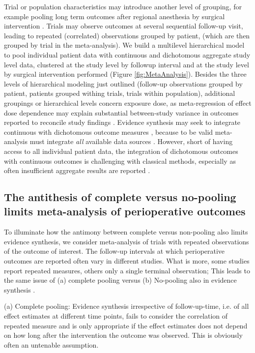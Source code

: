 \documentclass[11pt,notitlepage]{article}
\begin{document}
Trial or population characteristics may introduce another level of grouping, for example pooling long term outcomes after regional anesthesia by surgical intervention \cite{Andreae2013,Abroug2011}. Trials may observe outcomes at several sequential follow-up visit, leading to repeated (correlated) observations grouped by patient, (which are then grouped by trial in the  meta-analysis).  We build a multilevel hierarchical model to pool individual patient data with continuous and dichotomous aggregate study level data, clustered at the study level by followup interval and at the study level by surgical intervention performed (Figure \ref{fig:MetaAnalysis}). Besides the three levels of hierarchical modeling just outlined (follow-up observations grouped by patient, patients grouped withing trials, trials within population), additional groupings or hierarchical levels concern exposure dose, as meta-regression of effect dose dependence may explain substantial between-study variance in outcomes reported to reconcile study findings \cite{Andreae2015}. Evidence synthesis may seek to integrate continuous with dichotomous outcome measures \cite{AndreaeJohnsonAbstract2013}, because to be valid meta-analysis must integrate \textit{all} available data sources \cite{Deeks2011chapter}. However, short of having access to all individual patient data, the integration of dichotomous outcomes with continuous outcomes is challenging with classical methods\cite{Andreae2015}, especially as often insufficient aggregate results are reported \cite{Roth2015CriticalCare}. 

\subsection*{The antithesis of complete versus no-pooling limits meta-analysis of perioperative outcomes}
To illuminate how the antimony between complete versus non-pooling also limits evidence synthesis, we consider meta-analysis of trials with repeated observations of the outcome of interest. The follow-up intervals at which perioperative outcomes are reported often vary in different studies. What is more, some studies report repeated measures, others only a single terminal observation; This leads to the same issue of (a) complete pooling versus (b) No-pooling also in evidence synthesis \cite{Roth2015CriticalCare}.

(a) Complete pooling:
Evidence synthesis irrespective of follow-up-time, i.e. of all effect estimates 
at different time points, fails to consider the correlation of repeated measure 
and is only appropriate if the effect estimates does not depend on how long after 
the intervention the outcome was observed. This is obviously often an untenable
assumption.
\end{document}
